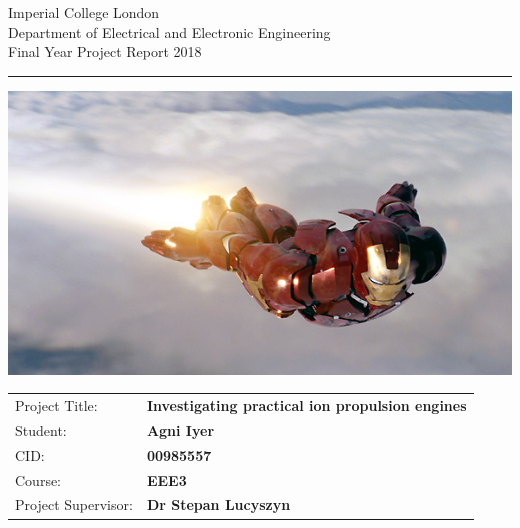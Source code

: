 \documentclass[11pt]{article}
\begin{document}
\begin{titlepage}
                \setlength{\parindent}{0pt}
                \setlength{\parskip}{0pt}

                {
                                \Large
                                \raggedright
                                Imperial College London\\[17pt]
                                Department of Electrical and Electronic Engineering\\[17pt]
                                Final Year Project Report 2018\\[17pt]
 
                }

                \rule{\columnwidth}{3pt}
                \vfill
                \centering
                  \includegraphics[width=\columnwidth]{cover.jpg}
                \vfill
                \setlength{\tabcolsep}{0pt}

                \begin{tabular}{p{40mm}p{\dimexpr\columnwidth-40mm}}
                                Project Title: & \textbf{Investigating practical ion propulsion engines} \\[12pt]
                                Student: & \textbf{Agni Iyer} \\[12pt]
                                CID: & \textbf{00985557} \\[12pt]
                                Course: & \textbf{EEE3} \\[12pt]
                                Project Supervisor: & \textbf{Dr Stepan Lucyszyn} \\[12pt]
                \end{tabular}
\end{titlepage}
\end{document}
